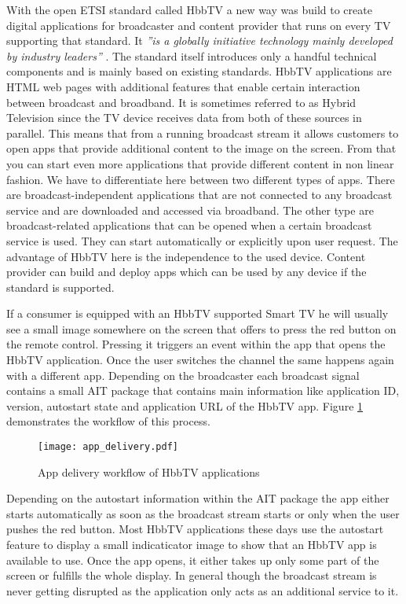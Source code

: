 With the open ETSI standard called HbbTV a new way was build to create digital applications for
broadcaster and content provider that runs on every TV supporting that standard. It \textit{''is
a globally initiative technology mainly developed by industry leaders''} \cite{zte}. The standard
itself introduces only a handful technical components and is mainly based on existing standards. HbbTV
applications are HTML web pages with additional features that enable certain interaction between
broadcast and broadband. It is sometimes referred to as Hybrid Television since the TV device receives
data from both of these sources in parallel. This means that from a running broadcast stream it allows
customers to open apps that provide additional content to the image on the screen. From that you can start
even more applications that provide different content in non linear fashion. We have to differentiate
here between two different types of apps. There are broadcast-independent applications that are not
connected to any broadcast service and are downloaded and accessed via broadband. The other type are
broadcast-related applications that can be opened when a certain broadcast service is used. They
can start automatically or explicitly upon user request. The advantage of HbbTV here is the independence
to the used device. Content provider can build and deploy apps which can be used by any device if the
standard is supported.

If a consumer is equipped with an HbbTV supported Smart TV he will usually see a small image somewhere
on the screen that offers to press the red button on the remote control. Pressing it triggers an
event within the app that opens the HbbTV application. Once the user switches the channel the same
happens again with a different app. Depending on the broadcaster each broadcast signal contains
a small AIT package that contains main information like application ID, version, autostart state and
application URL of the HbbTV app. Figure \ref{fig:app_delivery} demonstrates the workflow of this
process.

\begin{figure}[htb]
  \centering
  \texttt{[image: app\_delivery.pdf]}\\
  \caption{App delivery workflow of HbbTV applications}\label{fig:app_delivery}
\end{figure}

Depending on the autostart information within the AIT package the app either starts automatically
as soon as the broadcast stream starts or only when the user pushes the red button. Most HbbTV
applications these days use the autostart feature to display a small indicaticator image to
show that an HbbTV app is available to use. Once the app opens, it either takes up only some part
of the screen or fulfills the whole display. In general though the broadcast stream is never
getting disrupted as the application only acts as an additional service to it.

